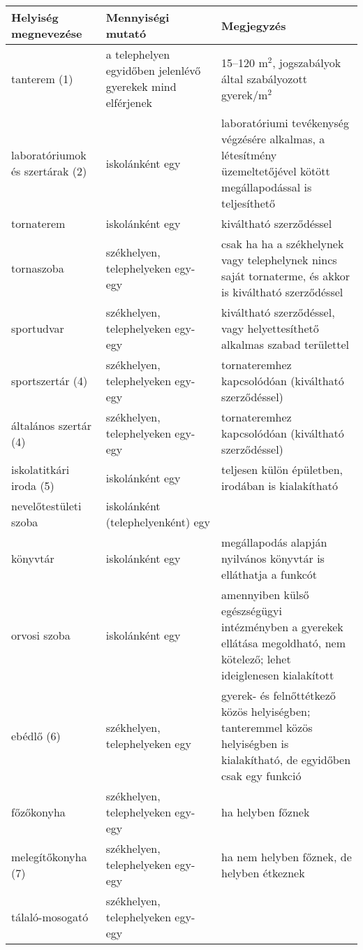 \begin{longtable}[]{@{}>{\begin{minipage}[t]{.3\textwidth}\raggedright
\strut}l<{\strut\end{minipage}}>{\begin{minipage}[t]{.3\textwidth}\raggedright
\strut}l<{\strut\end{minipage}}>{\begin{minipage}[t]{.4\textwidth}\raggedright
\strut}l<{\strut\end{minipage}}@{}}
\textbf{Helyiség megnevezése} &
\textbf{Mennyiségi mutató} &
\textbf{Megjegyzés}\tabularnewline
\hline
\endhead
tanterem (1) &
a telephelyen egyidőben jelenlévő gyerekek mind elférjenek &
15--120 m$^2$, jogszabályok által szabályozott gyerek/m$^2$
\tabularnewline
\hline
laboratóriumok és szertárak (2) &
iskolánként egy &
laboratóriumi tevékenység végzésére alkalmas, a létesítmény üzemeltetőjével
kötött megállapodással is teljesíthető
\tabularnewline
\hline
tornaterem &
iskolánként egy &
kiváltható szerződéssel
\tabularnewline
\hline
tornaszoba &
székhelyen, telephelyeken egy-egy &
csak ha ha a székhelynek vagy telephelynek nincs saját tornaterme, és akkor
is kiváltható szerződéssel
\tabularnewline
\hline
sportudvar &
székhelyen, telephelyeken egy-egy &
kiváltható szerződéssel, vagy helyettesíthető alkalmas szabad
területtel
\tabularnewline
\hline
sportszertár (4) &
székhelyen, telephelyeken egy-egy &
tornateremhez kapcsolódóan (kiváltható szerződéssel)
\tabularnewline
\hline
általános szertár (4) &
székhelyen, telephelyeken egy-egy &
tornateremhez kapcsolódóan (kiváltható szerződéssel)
\tabularnewline
\hline
iskolatitkári iroda (5) &
iskolánként egy &
teljesen külön épületben, irodában is kialakítható
\tabularnewline
\hline
nevelőtestületi szoba &
iskolánként (telephelyenként) egy &
\tabularnewline
\hline
könyvtár &
iskolánként egy &
megállapodás alapján nyilvános könyvtár is elláthatja a funkcót
\tabularnewline
\hline
orvosi szoba &
iskolánként egy &
amennyiben külső egészségügyi intézményben a gyerekek ellátása
megoldható, nem kötelező; lehet ideiglenesen kialakított
\tabularnewline
\hline
ebédlő (6) &
székhelyen, telephelyeken egy &
gyerek- és felnőttétkező közös helyiségben; tanteremmel közös helyiségben
is kialakítható, de egyidőben csak egy funkció
\tabularnewline
\hline
főzőkonyha &
székhelyen, telephelyeken egy-egy &
ha helyben főznek
\tabularnewline
\hline
melegítőkonyha (7) &
székhelyen, telephelyeken egy-egy &
ha nem helyben főznek, de helyben étkeznek
\tabularnewline
\hline
tálaló-mosogató &
székhelyen, telephelyeken egy-egy &

\end{longtable}
